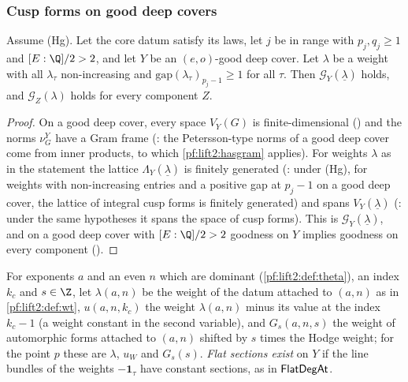 \subsubsection*{Cusp forms on good deep covers}

\begin{proposition}\label{pf:lift2:regdom}
Assume \textup{(Hg)}. Let the core datum satisfy its laws, let $j$ be in range with $p_j,q_j\ge1$ and $[E:\Q]/2>2$, and let
$Y$ be an $(e,o)$-good deep cover. Let $\lambda$ be a weight with all $\lambda_\tau$ non-increasing and
$\mathrm{gap}(\lambda_\tau)_{p_j-1}\ge1$ for all $\tau$. Then $\mathcal G_Y(\underline\lambda)$ holds, and
$\mathcal G_Z(\lambda)$ holds for every component $Z$.
\end{proposition}

\begin{proof}
On a good deep cover, every space $V_Y(G)$ is finite-dimensional ()
and the norms $\nu^Y_G$ have a Gram frame (: the Petersson-type norms of
a good deep cover come from inner products, to which \cref{pf:lift2:hasgram} applies). For weights $\lambda$ as in the
statement the lattice $\Lambda_Y(\underline\lambda)$ is finitely generated
(: under \textup{(Hg)}, for weights with
non-increasing entries and a positive gap at $p_j-1$ on a good deep cover, the lattice of integral cusp forms is finitely
generated) and spans $V_Y(\underline\lambda)$ (: under
the same hypotheses it spans the space of cusp forms). This is $\mathcal G_Y(\underline\lambda)$, and on a good deep
cover with $[E:\Q]/2>2$ goodness on $Y$ implies goodness on every component
().
\end{proof}

For exponents $a$ and an even $n$ which are dominant (\cref{pf:lift2:def:theta}), an index $k_c$ and $s\in\Z$, let
$\lambda(a,n)$ be the weight of the datum attached to $(a,n)$ as in \cref{pf:lift2:def:wt}, $u(a,n,k_c)$ the weight
$\lambda(a,n)$ minus its value at the index $k_c-1$ (a weight constant in the second variable), and $G_s(a,n,s)$ the
weight of automorphic forms attached to $(a,n)$ shifted by $s$ times the Hodge weight; for the point $p$ these are
$\lambda$, $u_W$ and $G_s(s)$. \emph{Flat sections exist} on $Y$ if the line bundles of the weights $-\mathbf1_\tau$ have
constant sections, as in $\mathsf{FlatDegAt}$.

